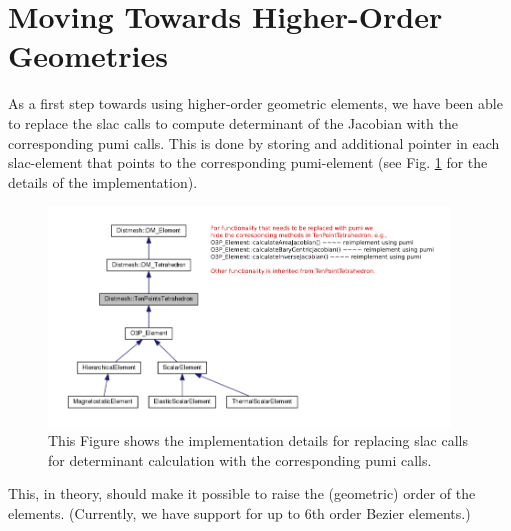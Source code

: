 \documentclass[review,authoryear,12pt]{elsarticle_summary_report}
\begin{document}
\section{Moving Towards Higher-Order Geometries}
As a first step towards using higher-order geometric elements, we have been able to replace the slac calls to compute determinant of the Jacobian with the corresponding pumi calls. This is done by storing and additional pointer in each slac-element that points to the corresponding  pumi-element (see Fig. \ref{imp} for the details of the implementation). 
\begin{figure}[ph!]
\centering
\includegraphics[width=0.95\textwidth]{hide_ten_point_tet.png}
\caption{\label{imp} This Figure shows the implementation details for replacing slac calls for determinant calculation with the corresponding pumi calls.}
\end{figure}
This, in theory, should make it possible to raise the (geometric) order of the elements. (Currently, we have support for up to 6th order Bezier elements.)

% 
%  

\newpage 

\end{document}
